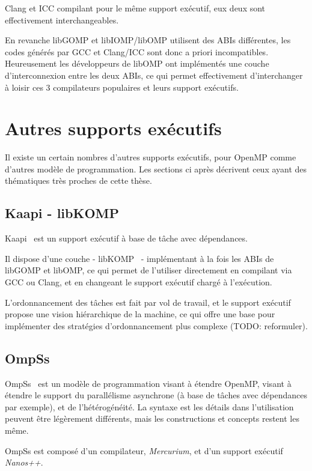Clang et ICC compilant pour le même support exécutif, eux deux sont effectivement interchangeables.

En revanche libGOMP et libIOMP/libOMP utilisent des ABIs différentes, les codes générés par GCC et Clang/ICC sont donc a priori incompatibles.
Heureusement les développeurs de libOMP ont implémentés une couche d'interconnexion entre les deux ABIs, ce qui permet effectivement d'interchanger à loisir ces 3 compilateurs populaires et leurs support exécutifs.

\section{Autres supports exécutifs}\label{sec:rw:other-runtimes}

Il existe un certain nombres d'autres supports exécutifs, pour OpenMP comme d'autres modèle de programmation.
Les sections ci après décrivent ceux ayant des thématiques très proches de cette thèse.

\subsection{Kaapi - libKOMP}

Kaapi~\cite{Gautier2007} est un support exécutif à base de tâche avec dépendances.

Il dispose d'une couche - libKOMP~\cite{Broquedis2012} - implémentant à la fois les ABIs de libGOMP et libOMP, ce qui permet de l'utiliser directement en compilant via GCC ou Clang, et en changeant le support exécutif chargé à l'exécution.

L'ordonnancement des tâches est fait par vol de travail, et le support exécutif propose une vision hiérarchique de la machine, ce qui offre une base pour implémenter des stratégies d'ordonnancement plus complexe (TODO: reformuler).


\subsection{OmpSs}\label{subsec:rw:ompss}

OmpSs~\cite{OMPSs} est un modèle de programmation visant à étendre OpenMP, visant à étendre le support du parallélisme asynchrone (à base de tâches avec dépendances par exemple), et de l'hétérogénéité.
La syntaxe est les détails dans l'utilisation peuvent être légèrement différents, mais les constructions et concepts restent les même.

OmpSs est composé d'un compilateur, \emph{Mercurium}, et d'un support exécutif \emph{Nanos++}.

